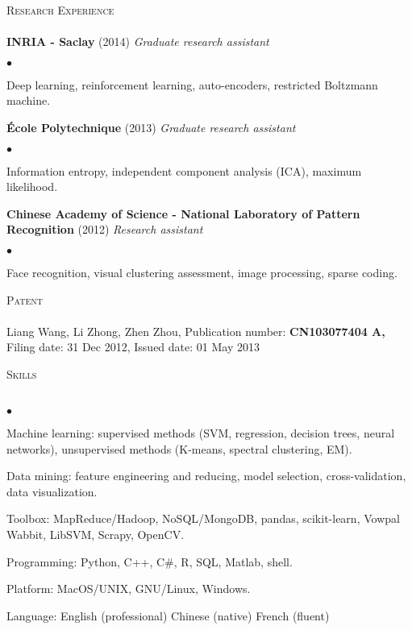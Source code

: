 \documentclass{article}
\newcommand{\lineunder}{\vspace*{-8pt} \\ \hspace*{-18pt} \hrulefill \\}
\newcommand{\header}[1]{{\hspace*{-15pt}\vspace*{6pt} \textsc{#1}} \vspace*{-6pt} \lineunder}
\newcommand{\employer}[3]{{ \textbf{#1} (#2) \hfill {\emph{#3}} \\  }}
\newcommand{\patent}[3]{{ #1 #2 \\ #3\\  }}
\newenvironment{achievements}{\begin{list}{$\bullet$}{\topsep 0pt \itemsep -2pt}}{\vspace*{4pt}\end{list}}
\begin{document}
	


\header{Research Experience}
\employer{INRIA - Saclay}{2014}{Graduate research assistant}
	\begin{achievements}
	\item Deep learning, reinforcement learning, auto-encoders, restricted Boltzmann machine.
	\end{achievements}

\employer{\'Ecole Polytechnique}{2013}{Graduate research assistant}
	\begin{achievements}
	\item Information entropy, independent component analysis (ICA), maximum likelihood.
	\end{achievements}


\employer{Chinese Academy of Science - National Laboratory of Pattern Recognition}{2012}{Research assistant}
	\begin{achievements}
	\item Face recognition, visual clustering assessment, image processing, sparse coding.
	\end{achievements}

\header{Patent}
\patent{Liang Wang, Li Zhong, Zhen Zhou,}{Publication number: \textbf{CN103077404 A,}} {Filing date: 31 Dec 2012, Issued date: 01 May 2013}

\header{Skills}
\begin{achievements}
\item Machine learning: supervised methods (SVM, regression, decision trees, neural networks), unsupervised methods (K-means, spectral clustering, EM).
\item Data mining: feature engineering and reducing, model selection, cross-validation, data visualization.
\item Toolbox: MapReduce/Hadoop, NoSQL/MongoDB, pandas, scikit-learn, Vowpal Wabbit, LibSVM, Scrapy, OpenCV.
\item Programming: Python, C++, C\#, R, SQL, Matlab, shell.
\item Platform: MacOS/UNIX, GNU/Linux, Windows.
\item Language: English (professional) \hspace*{16pt} Chinese (native) \hspace*{16pt} French (fluent)
\end{achievements}
\end{document}
